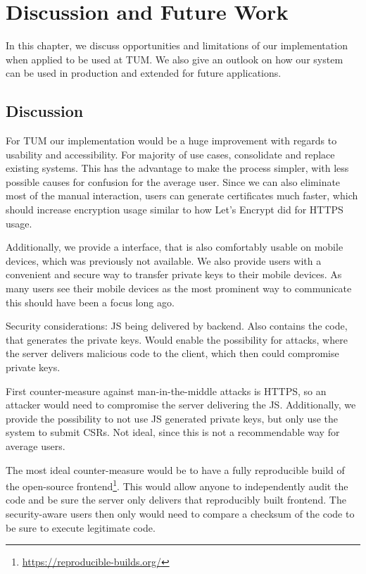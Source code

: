 \chapter{Discussion and Future Work}\label{ch:futureWork}

In this chapter, we discuss opportunities and limitations of our implementation when applied to be used at TUM.
We also give an outlook on how our system can be used in production and extended for future applications.

\section*{Discussion}

For TUM our implementation would be a huge improvement with regards to usability and accessibility.
For majority of use cases, consolidate and replace existing systems.
This has the advantage to make the process simpler, with less possible causes for confusion for the average user.
Since we can also eliminate most of the manual interaction, users can generate certificates much faster, which should
increase encryption usage similar to how Let's Encrypt did for HTTPS usage.

Additionally, we provide a interface, that is also comfortably usable on mobile devices, which was previously not
available.
We also provide users with a convenient and secure way to transfer private keys to their mobile devices.
As many users see their mobile devices as the most prominent way to communicate this should have been a focus long ago.

Security considerations:
JS being delivered by backend.
Also contains the code, that generates the private keys.
Would enable the possibility for attacks, where the server delivers malicious code to the client, which then could
compromise private keys.

First counter-measure against man-in-the-middle attacks is HTTPS, so an attacker would need to compromise the server
delivering the JS.
Additionally, we provide the possibility to not use JS generated private keys, but only use the system to
submit CSRs.
Not ideal, since this is not a recommendable way for average users.

The most ideal counter-measure would be to have a fully reproducible build of the open-source
frontend\footnote{\url{https://reproducible-builds.org/}}.
This would allow anyone to independently audit the code and be sure the server only delivers that reproducibly built
frontend.
The security-aware users then only would need to compare a checksum of the code to be sure to execute legitimate code.


